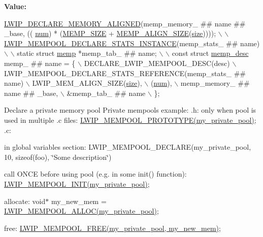 {\bfseries Value\+:}
\begin{DoxyCode}
\hyperlink{group__compiler__abstraction_ga651bb349041669fe717b19f127ef16c0}{LWIP\_DECLARE\_MEMORY\_ALIGNED}(memp\_memory\_ ## name ## \_base, ((
      \hyperlink{structmemp__desc_a2c32db78e565b8812ca0e20fe929a8a7}{num}) * (\hyperlink{native_2lwip_2src_2include_2lwip_2priv_2memp__priv_8h_a7f8c378e0581aa2dc491cff52ae4fce2}{MEMP\_SIZE} + \hyperlink{native_2lwip_2src_2include_2lwip_2priv_2memp__priv_8h_a12e0cfbac9c8263e5a1fb319b92338e7}{MEMP\_ALIGN\_SIZE}(\hyperlink{structmemp__desc_a1688d2bdd5a7b77700e1fa627f025ba3}{size})))); \hyperlink{native_2lwip_2src_2include_2lwip_2priv_2memp__priv_8h_a9373cb7cc6e658a60cec6ca57173a72d}{\(\backslash\)}
\hyperlink{native_2lwip_2src_2include_2lwip_2priv_2memp__priv_8h_a9373cb7cc6e658a60cec6ca57173a72d}{    \(\backslash\)}
\hyperlink{native_2lwip_2src_2include_2lwip_2priv_2memp__priv_8h_a9373cb7cc6e658a60cec6ca57173a72d}{  LWIP\_MEMPOOL\_DECLARE\_STATS\_INSTANCE}(memp\_stats\_ ## name) \(\backslash\)
    \(\backslash\)
  static \textcolor{keyword}{struct }\hyperlink{structmemp}{memp} *memp\_tab\_ ## name; \(\backslash\)
    \(\backslash\)
  const \textcolor{keyword}{struct }\hyperlink{structmemp__desc}{memp\_desc} memp\_ ## name = \{ \(\backslash\)
    DECLARE\_LWIP\_MEMPOOL\_DESC(desc) \(\backslash\)
    LWIP\_MEMPOOL\_DECLARE\_STATS\_REFERENCE(memp\_stats\_ ## name) \(\backslash\)
    LWIP\_MEM\_ALIGN\_SIZE(\hyperlink{structmemp__desc_a1688d2bdd5a7b77700e1fa627f025ba3}{size}), \(\backslash\)
    (\hyperlink{structmemp__desc_a2c32db78e565b8812ca0e20fe929a8a7}{num}), \(\backslash\)
    memp\_memory\_ ## name ## \_base, \(\backslash\)
    &memp\_tab\_ ## name \(\backslash\)
  \};
\end{DoxyCode}
Declare a private memory pool Private mempools example\+: .h\+: only when pool is used in multiple .c files\+: \hyperlink{group__mempool_ga92fc8c29d0e2654f2a2ecc43b2b7fb13}{L\+W\+I\+P\+\_\+\+M\+E\+M\+P\+O\+O\+L\+\_\+\+P\+R\+O\+T\+O\+T\+Y\+P\+E(my\+\_\+private\+\_\+pool)}; .c\+:
\begin{DoxyItemize}
\item in global variables section\+: L\+W\+I\+P\+\_\+\+M\+E\+M\+P\+O\+O\+L\+\_\+\+D\+E\+C\+L\+A\+RE(my\+\_\+private\+\_\+pool, 10, sizeof(foo), \char`\"{}\+Some description\char`\"{})
\item call O\+N\+CE before using pool (e.\+g. in some init() function)\+: \hyperlink{group__mempool_ga60b51c06d276f525b35d8b7abd4dcb41}{L\+W\+I\+P\+\_\+\+M\+E\+M\+P\+O\+O\+L\+\_\+\+I\+N\+I\+T(my\+\_\+private\+\_\+pool)};
\item allocate\+: void$\ast$ my\+\_\+new\+\_\+mem = \hyperlink{group__mempool_ga5e2498f6c17746c1fe7153de5f7f275a}{L\+W\+I\+P\+\_\+\+M\+E\+M\+P\+O\+O\+L\+\_\+\+A\+L\+L\+O\+C(my\+\_\+private\+\_\+pool)};
\item free\+: \hyperlink{group__mempool_gaa43d114dd702fbd8f1db18474ea93a04}{L\+W\+I\+P\+\_\+\+M\+E\+M\+P\+O\+O\+L\+\_\+\+F\+R\+E\+E(my\+\_\+private\+\_\+pool, my\+\_\+new\+\_\+mem)};
\end{DoxyItemize}

